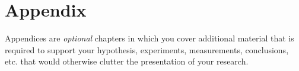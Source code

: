 \chapter{Appendix}\label{appendix}
Appendices are \emph{optional} chapters in which you cover additional material that is required to support your
hypothesis, experiments, measurements, conclusions, etc. that would otherwise
clutter the presentation of your research.
